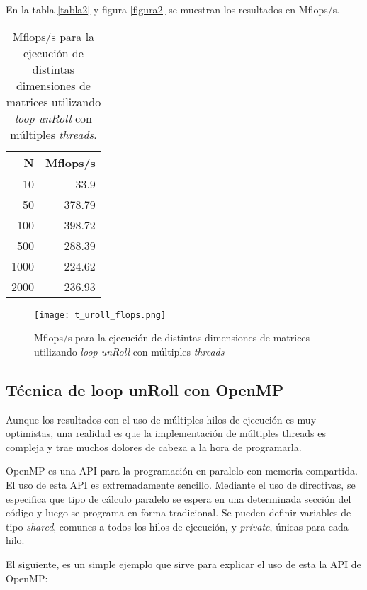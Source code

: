 \documentclass[a4paper,11pt]{article}
\begin{document}
En la tabla \ref{tabla2} y figura \ref{figura2} se muestran los resultados en Mflops/s.

\begin{table}
\begin{center}
\begin{tabular}{|r|r|}
\hline
         N & Mflops/s \\
\hline
        10 &   33.9 \\
\hline
        50 &   378.79 \\
\hline
       100 &   398.72 \\
\hline
       500 &   288.39 \\
\hline
      1000 &   224.62 \\
\hline
      2000 &   236.93 \\
\hline
\end{tabular}
\caption{Mflops/s para la ejecuci\'on de distintas dimensiones de matrices utilizando \emph{loop unRoll} con m\'ultiples \emph{threads}.}\label{tabla4}
\end{center}
\end{table}

\begin{figure}
\centering
\texttt{[image: t\_uroll\_flops.png]}
\caption{Mflops/s para la ejecuci\'on de distintas dimensiones de matrices utilizando \emph{loop unRoll} con m\'ultiples \emph{threads}}\label{figura4}
\end{figure}

\subsection{T\'ecnica de loop unRoll con OpenMP}
\label{loopunroll_openmp}

Aunque los resultados con el uso de m\'ultiples hilos de ejecuci\'on es muy optimistas, una realidad es que la implementaci\'on de m\'ultiples threads es compleja y trae muchos dolores de cabeza a la hora de programarla.

OpenMP es una API para la programaci\'on en paralelo con memoria compartida. El uso de esta API es extremadamente sencillo. Mediante el uso de directivas, se especifica que tipo de c\'alculo paralelo se espera en una determinada secci\'on del c\'odigo y luego se programa en forma tradicional. Se pueden definir variables de tipo \emph{shared}, comunes a todos los hilos de ejecuci\'on, y \emph{private}, \'unicas para cada hilo.

El siguiente, es un simple ejemplo que sirve para explicar el uso de esta la API de OpenMP:
\end{document}
